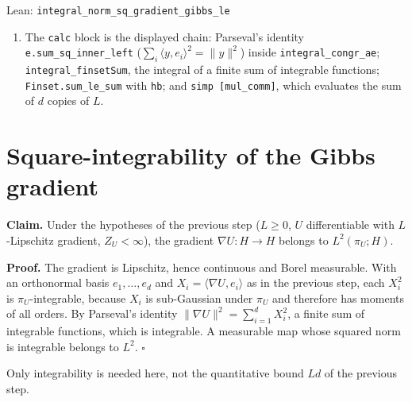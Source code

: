 \documentclass[11pt,a4paper]{article}
\begin{document}
\begin{leanbox}{Lean: \texttt{integral\_\allowbreak{}norm\_\allowbreak{}sq\_\allowbreak{}gradient\_\allowbreak{}gibbs\_\allowbreak{}le}}
\begin{enumerate}
\item The \texttt{calc} block is the displayed chain: Parseval's identity \texttt{e.\allowbreak{}sum\_\allowbreak{}sq\_\allowbreak{}inner\_\allowbreak{}left} (\(\sum_i\langle y,e_i\rangle^2=\|y\|^2\)) inside \texttt{integral\_\allowbreak{}congr\_\allowbreak{}ae}; \texttt{integral\_\allowbreak{}finset\allowbreak{}Sum}, the integral of a finite sum of integrable functions; \texttt{Finset.\allowbreak{}sum\_\allowbreak{}le\_\allowbreak{}sum} with \texttt{hb}; and \texttt{simp [mul\_\allowbreak{}comm]}, which evaluates the sum of \(d\) copies of \(L\).

\end{enumerate}
\end{leanbox}

\section{\texorpdfstring{Square-integrability of the Gibbs gradient}{Square-integrability of the Gibbs gradient}}


\textbf{Claim.} Under the hypotheses of the previous step (\(L\ge0\), \(U\) differentiable with \(L\)-Lipschitz gradient, \(Z_U<\infty\)), the gradient \(\nabla U:H\to H\) belongs to \(L^2(\pi_U;H)\).




\textbf{Proof.} The gradient is Lipschitz, hence continuous and Borel measurable. With an orthonormal basis \(e_1,\dots,e_d\) and \(X_i=\langle\nabla U,e_i\rangle\) as in the previous step, each \(X_i^2\) is \(\pi_U\)-integrable, because \(X_i\) is sub-Gaussian under \(\pi_U\) and therefore has moments of all orders. By Parseval's identity \(\|\nabla U\|^2=\sum_{i=1}^dX_i^2\), a finite sum of integrable functions, which is integrable. A measurable map whose squared norm is integrable belongs to \(L^2\). \(\square\)




Only integrability is needed here, not the quantitative bound \(Ld\) of the previous step.
\end{document}
